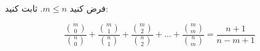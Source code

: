 	فرض کنید $m\leq n$. ثابت کنید:

	$$\frac{{m \choose 0}}{{n \choose 0}}  + \frac{{m \choose 1}}{{n \choose 1}} + \frac{{m \choose 2}}{{n \choose 2}} + ... + \frac{{m \choose m}}{{n \choose m}} = \frac{n + 1}{n - m + 1}$$